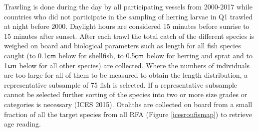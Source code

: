 \documentclass[a4paper 12pt]{article}
\numberwithin{equation}{section}
\newcommand{\cm}{\textnormal{\sffamily cm}\xspace}
\begin{document}
\indent Trawling is done during the day by all participating vessels from 2000-2017 while countries who did not participate in the sampling of herring larvae in Q1 trawled at night before 2000. Daylight hours are considered 15 minutes before sunrise to 15 minutes  after sunset. After each trawl the total catch of the different species is weighed on board and biological parameters such as length for all fish species caught (to 0.1$\cm$ below for shellfish, to 0.5$\cm$ below for herring and sprat and to 1$\cm$ below for all other species) are collected. Where the numbers of individuals are too large for all of them  to be measured to obtain the length distribution, a representative subsample of 75 fish is selected. If a representative subsample cannot be selected further sorting of the species into two or more size grades or categories is necessary (ICES 2015). Otoliths are collected on board from a small fraction of all the target species from all RFA (Figure \ref{icesroufismap}) to retrieve age reading.\\ 
\end{document}
